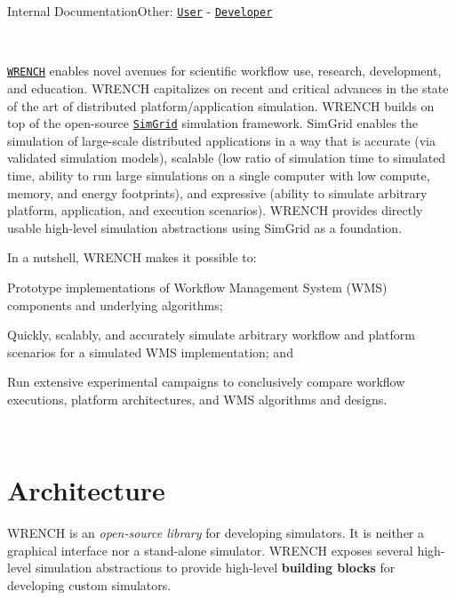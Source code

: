 Internal DocumentationOther\+: \href{../user/}{\tt User} -\/ \href{../developer/}{\tt Developer}

 ~\newline
~\newline


\href{http://wrench-project.org}{\tt W\+R\+E\+N\+CH} enables novel avenues for scientific workflow use, research, development, and education. W\+R\+E\+N\+CH capitalizes on recent and critical advances in the state of the art of distributed platform/application simulation. W\+R\+E\+N\+CH builds on top of the open-\/source \href{http://simgrid.gforge.inria.fr}{\tt Sim\+Grid} simulation framework. Sim\+Grid enables the simulation of large-\/scale distributed applications in a way that is accurate (via validated simulation models), scalable (low ratio of simulation time to simulated time, ability to run large simulations on a single computer with low compute, memory, and energy footprints), and expressive (ability to simulate arbitrary platform, application, and execution scenarios). W\+R\+E\+N\+CH provides directly usable high-\/level simulation abstractions using Sim\+Grid as a foundation.

In a nutshell, W\+R\+E\+N\+CH makes it possible to\+:


\begin{DoxyItemize}
\item Prototype implementations of Workflow Management System (W\+MS) components and underlying algorithms;
\item Quickly, scalably, and accurately simulate arbitrary workflow and platform scenarios for a simulated W\+MS implementation; and
\item Run extensive experimental campaigns to conclusively compare workflow executions, platform architectures, and W\+MS algorithms and designs.
\end{DoxyItemize}

~\newline
\hypertarget{index_overview-architecture}{}\section{Architecture}\label{index_overview-architecture}
W\+R\+E\+N\+CH is an {\itshape open-\/source library} for developing simulators. It is neither a graphical interface nor a stand-\/alone simulator. W\+R\+E\+N\+CH exposes several high-\/level simulation abstractions to provide high-\/level {\bfseries building blocks} for developing custom simulators.

